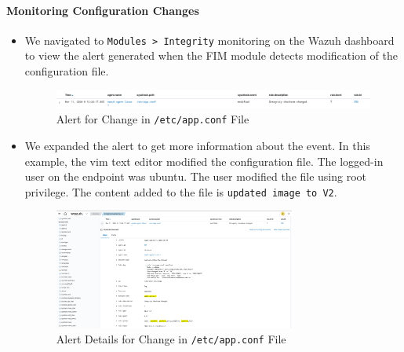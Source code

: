 \paragraph{Monitoring Configuration Changes}
\begin{itemize}
    \item We navigated to \texttt{Modules > Integrity} monitoring on the Wazuh dashboard to view the alert generated when the FIM module detects modification of the configuration file.
          \begin{figure} [H]
              \centering
              \includegraphics[width=\textwidth]{images/fim/fim-6.png}
              \caption{Alert for Change in \texttt{/etc/app.conf} File}
              \label{fig:fim-6}
          \end{figure}

    \item We expanded the alert to get more information about the event. In this example, the vim text editor modified the configuration file. The logged-in user on the endpoint was ubuntu. The user modified the file using root privilege. The content added to the file is \texttt{updated image to V2}.
          \begin{figure} [H]
              \centering
              \includegraphics[width=0.75\textwidth]{images/fim/fim-8.png}
              \caption{Alert Details for Change in \texttt{/etc/app.conf} File}
              \label{fig:fim-8}
          \end{figure}

\end{itemize}
